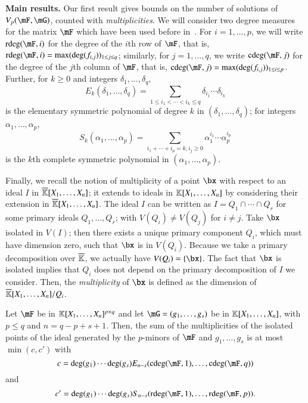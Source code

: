 {\bf Main results.} Our first result gives bounds on the number of solutions of
$\VpFG{p}{\mF}{\mG}$, counted with {\em multiplicities}. We will consider two
degree measures for the matrix $\mF$ which have been used before in~\cite{NieRan09,MiSt04}. For
$i=1,\dots,p$, we will write $\rdeg(\mF,i)$ for the degree of the $i$th row of
$\mF$, that is, $\rdeg(\mF,i)=\max(\deg(f_{i,j}))_{1 \le j \le q}$; similarly,
for $j=1,\dots,q$, we write $\cdeg(\mF,j)$ for the degree of the $j$th column of
$\mF$, that is, $\cdeg(\mF,j)=\max(\deg(f_{i,j}))_{1 \le i \le p}$. Further, for
$k \ge 0$ and integers $\delta_1,\dots,\delta_q$,
$$E_k(\delta_1,\dots,\delta_q)=\sum_{1\leq i_1 < \cdots < i_k \leq
  q}\delta_{i_1} \cdots \delta_{i_k}$$ is the elementary symmetric
polynomial of degree $k$ in $(\delta_1, \ldots, \delta_q)$; 
for integers $\alpha_1,\dots,\alpha_p$,
$$S_k(\alpha_1,\dots,\alpha_p) = \sum_{i_1+\cdots+i_p=k, i_j \geq
  0}\alpha_1^{i_1}\cdots\alpha_p^{i_p}$$ is the $k$th complete
symmetric polynomial in $(\alpha_1,\dots,\alpha_p)$.

Finally, we recall the notion of multiplicity of a point $\bx$ with respect to
an ideal $I$ in $\overline{\mathbb{K}}[X_1,\dots,X_n]$; it extends to ideals in
$\mathbb{K}[X_1, \ldots, X_n]$ by considering their extension in $\overline{\mathbb{K}}[X_1, \ldots,
X_n]$. The ideal $I$ can be written
as %
$I=Q_1\cap\cdots \cap Q_r$ for some primary ideals $Q_1,\dots,Q_r$; with
$V(Q_i)\neq V(Q_j)$ for $i\neq j$. Take $\bx$ isolated in $V(I)$; then there
exists a unique primary component $Q_i$, which must have dimension zero, such
that $\bx$ is in $V(Q_i)$. Because we take a primary decomposition over
$\overline{\mathbb{K}}$, we actually have $V(Q_i)=\{\bx\}$. %
The fact that $\bx$ is isolated implies
that $Q_i$ does not depend on the primary decomposition of $I$ we
consider. Then, the \emph{multiplicity} of $\bx$ is defined as the
dimension of $\overline{\mathbb{K}}[X_1,\dots,X_n]/Q_i$. %


\begin{theorem}\label{theo:1}
  Let $\mF$ be in $\mathbb{K}[X_1,\dots,X_n]^{p \times q}$ and let
  $\mG=(g_1,\dots,g_s)$ be in $\mathbb{K}[X_1,\dots,X_n]$, with $p \le q$ and
  $n=q-p+s+1$. Then, the sum of the multiplicities of the isolated
  points of the ideal generated by the $p$-minors of $\mF$ and 
$ g_1,\dots,g_s$ is at most
  $\min(c,c')$ with
$$c=\deg(g_1) \cdots \deg(g_s) E_{n-s}(\cdeg(\mF,1), \ldots, \cdeg(\mF,q))$$
and
$$c'=\deg(g_1) \cdots \deg(g_s) S_{n-s}(\rdeg(\mF,1), \ldots, \rdeg(\mF,p)).$$
\end{theorem}


